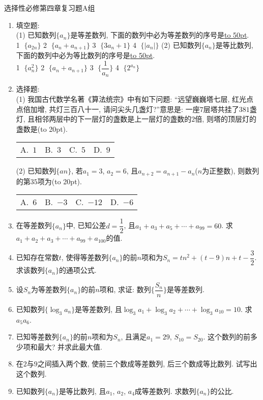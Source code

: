 \documentclass[10pt,a4paper]{article}
\newcommand{\blank}[1]{\underline{\hbox to #1pt{}}}
\newcommand{\bracket}[1]{(\hbox to #1pt{})}
\newcommand{\fourch}[4]{\par\begin{tabular}{p{.23\textwidth}p{.23\textwidth}p{.23\textwidth}p{.23\textwidth}}
A.~#1 &B.~#2& C.~#3& D.~#4
\end{tabular}}
\begin{document}
选择性必修第四章复习题A组

\begin{enumerate}[1.]

\item 填空题:\\
(1) 已知数列$\{a_n\}$是等差数列, 下面的数列中必为等差数列的序号是\blank{50}.\\
\textcircled{1} $\{a_{2n}\}$ \textcircled{2} $\{a_n+a_{n+1}\}$ \textcircled{3} $\{3a_n+1\}$ \textcircled{4} $\{|a_n|\}$
(2) 已知数列$\{a_n\}$是等比数列, 下面的数列中必为等比数列的序号是\blank{50}.\\
\textcircled{1} $\{a_n^2\}$ \textcircled{2} $\{a_n+a_{n+1}\}$ \textcircled{3} $\{\dfrac 1{a_n}\}$ \textcircled{4} $\{2^{a_n}\}$
\vspace*{3cm}
\item 选择题:\\
(1) 我国古代数学名著《算法统宗》中有如下问题: ``远望巍巍塔七层, 红光点点倍加增, 共灯三百八十一, 请问尖头几盏灯?''意思是: 一座$7$层塔共挂了$381$盏灯, 且相邻两层中的下一层灯的盏数是上一层灯的盏数的$2$倍, 则塔的顶层灯的盏数是\bracket{20}.
\fourch{$1$}{$3$}{$5$}{$9$}
(2) 已知数列$\{an\}$, 若$a_1=3$, $a_2=6$, 且$a_{n+2}=a_{n+1}-a_n$($n$为正整数), 则数列的第$35$项为\bracket{20}.
\fourch{$6$}{$-3$}{$-12$}{$-6$}
\vspace*{3cm}
\item 在等差数列$\{a_n\}$中, 已知公差$d=\dfrac12$, 且$a_1+a_3+a_5+\cdots+a_{99}=60$. 求$a_1+a_2+a_3+\cdots+a_{99}+a_{100}$的值.
\vspace*{3cm}
\item 已知存在常数$t$, 使得等差数列$\{a_n\}$的前$n$项和为$S_n=tn^2+(t-9)n+t-\dfrac 32$. 求该数列$\{a_n\}$的通项公式.
\vspace*{3cm}
\item 设$S_n$为等差数列$\{a_n\}$的前$n$项和, 求证: 数列$\{\dfrac{S_n}n\}$是等差数列.
\vspace*{3cm}
\item 已知数列$\{\log_3a_n\}$是等差数列, 且$\log_3a_1+\log_3a_2+\cdots+\log_3a_{10}=10$. 求$a_5a_6$.
\vspace*{3cm}
\item 已知等差数列$\{a_n\}$的前$n$项和为$S_n$, 且满足$a_1=29$, $S_{10}=S_{20}$. 这个数列的前多少项和最大? 并求此最大值.
\vspace*{3cm}
\item 在$2$与$9$之间插入两个数, 使前三个数成等差数列, 后三个数成等比数列. 试写出这个数列.
\vspace*{3cm}
\item 已知数列$\{a_n\}$是等比数列, 且$a_1$, $a_2$, $a_4$成等差数列. 求数列$\{a_n\}$的公比.

\end{enumerate}
\end{document}
